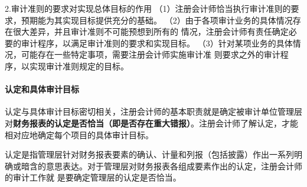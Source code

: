 \documentclass[UTF8,12pt]{ctexart}
\numberwithin{equation}{section} %
\numberwithin{figure}{section}
\numberwithin{table}{section}
\begin{document}
	2.审计准则的要求对实现总体目标的作用
	（1）注册会计师恰当执行审计准则的要求，预期能为其实现目标提供充分的基础。
	（2）由于各项审计业务的具体情况存在很大差异，并且审计准则不可能预想到所有的
	情况，注册会计师有责任确定必要的审计程序，以满足审计准则的要求和实现目标。
	（3）针对某项业务的具体情况，可能存在一些特定事项，需要注册会计师实施审计准
	则要求之外的审计程序，以实现审计准则规定的目标。
	
	\paragraph{认定和具体审计目标}
	
	认定与具体审计目标密切相关，注册会计师的基本职责就是确定被审计单位管理层对\textbf{财务报表的认定是否恰当（即是否存在重大错报）}。注册会计师了解认定，才能相对应地确定每个项目的具体审计目标。
	
	认定是指管理层针对财务报表要素的确认、计量和列报（包括披露）作出一系列明确或暗含的意思表达。对于管理层对财务报表各组成要素作出的认定，注册会计师的审计工作就
	是要确定管理层的认定是否恰当。
	
\end{document}
